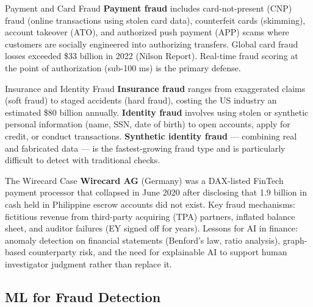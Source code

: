 \begin{v3topic}{Payment and Card Fraud}
    \textbf{Payment fraud} includes card-not-present (CNP) fraud (online transactions using stolen card data), counterfeit cards (skimming), account takeover (ATO), and authorized push payment (APP) scams where customers are socially engineered into authorizing transfers.
    Global card fraud losses exceeded \$33 billion in 2022 (Nilson Report).
    Real-time fraud scoring at the point of authorization (sub-100 ms) is the primary defense.

\end{v3topic}
\begin{v3topic}{Insurance and Identity Fraud}
    \textbf{Insurance fraud} ranges from exaggerated claims (soft fraud) to staged accidents (hard fraud), costing the US industry an estimated \$80 billion annually.
    \textbf{Identity fraud} involves using stolen or synthetic personal information (name, SSN, date of birth) to open accounts, apply for credit, or conduct transactions.
    \textbf{Synthetic identity fraud} — combining real and fabricated data — is the fastest-growing fraud type and is particularly difficult to detect with traditional checks.

\end{v3topic}
\begin{v3topic}{The Wirecard Case}
    \textbf{Wirecard AG} (Germany) was a DAX-listed FinTech payment processor that collapsed in June 2020 after disclosing that \texteuro{}1.9 billion in cash held in Philippine escrow accounts did not exist.
    Key fraud mechanisms: fictitious revenue from third-party acquiring (TPA) partners, inflated balance sheet, and auditor failures (EY signed off for years).
    Lessons for AI in finance: anomaly detection on financial statements (Benford's law, ratio analysis), graph-based counterparty risk, and the need for explainable AI to support human investigator judgment rather than replace it.

\end{v3topic}

\subsection{ML for Fraud Detection}


